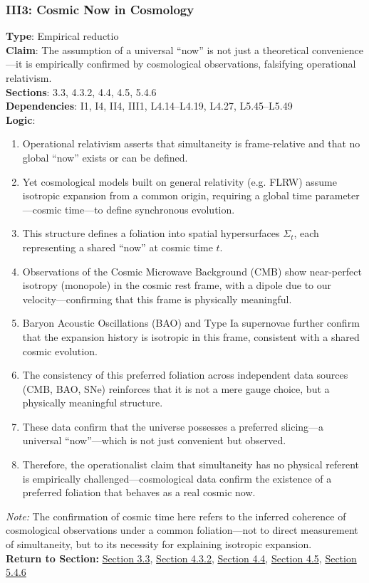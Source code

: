\documentclass[12pt]{book}
\begin{document}
\subsubsection*{III3: Cosmic Now in Cosmology}
\label{appendix:III3}
\textbf{Type}: Empirical reductio\\
\textbf{Claim}: The assumption of a universal ``now'' is not just a theoretical convenience---it is empirically confirmed by cosmological observations, falsifying operational relativism.\\
\textbf{Sections}: 3.3, 4.3.2, 4.4, 4.5, 5.4.6\\
\textbf{Dependencies}: I1, I4, II4, III1, L4.14–L4.19, L4.27, L5.45–L5.49\\
\textbf{Logic}:
\begin{enumerate}
    \item Operational relativism asserts that simultaneity is frame-relative and that no global ``now'' exists or can be defined.
    \item Yet cosmological models built on general relativity (e.g. FLRW) assume isotropic expansion from a common origin, requiring a global time parameter---cosmic time---to define synchronous evolution.
    \item This structure defines a foliation into spatial hypersurfaces \(\Sigma_t\), each representing a shared ``now'' at cosmic time \(t\).
    \item Observations of the Cosmic Microwave Background (CMB) show near-perfect isotropy (monopole) in the cosmic rest frame, with a dipole due to our velocity---confirming that this frame is physically meaningful.
    \item Baryon Acoustic Oscillations (BAO) and Type Ia supernovae further confirm that the expansion history is isotropic in this frame, consistent with a shared cosmic evolution.
    \item The consistency of this preferred foliation across independent data sources (CMB, BAO, SNe) reinforces that it is not a mere gauge choice, but a physically meaningful structure.
    \item These data confirm that the universe possesses a preferred slicing---a universal ``now''---which is not just convenient but observed.
    \item Therefore, the operationalist claim that simultaneity has no physical referent is empirically challenged---cosmological data confirm the existence of a preferred foliation that behaves as a real cosmic now.
\end{enumerate}
\textit{Note:} The confirmation of cosmic time here refers to the inferred coherence of cosmological observations under a common foliation---not to direct measurement of simultaneity, but to its necessity for explaining isotropic expansion.\\
\textbf{Return to Section:} \hyperref[sec:3.3]{Section 3.3}, \hyperref[sec:4.3.2]{Section 4.3.2}, \hyperref[sec:4.4]{Section 4.4}, \hyperref[sec:4.5]{Section 4.5}, \hyperref[sec:5.4.6]{Section 5.4.6}
\end{document}
